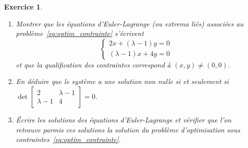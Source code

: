 \documentclass[11pt]{article}
\theoremstyle{exostyle}
\newtheorem{exercice}{Exercice}
\begin{document}
\begin{exercice}
\begin{enumerate}
  \item Montrer que les équations d’Euler-Lagrange (ou extrema liés) associées au problème~\eqref{eq:optim_contrainte} s’écrivent 
    \[
      \left\lbrace 
        \begin{aligned}
          2x + (\lambda-1) y = 0 \\
          (\lambda-1)x + 4y =0
        \end{aligned}
      \right.
    \]
    et que la qualification des contraintes correspond à $(x,y) \not= (0,0)$.

  \item En déduire que le système a une solution non nulle si et seulement si $\det \begin{bmatrix}
      2 & \lambda-1 \\
      \lambda -1 & 4
    \end{bmatrix} = 0$.

  \item Écrire les solutions des équations d’Euler-Lagrange et vérifier que l’on retrouve parmis ces solutions la solution du problème d’optimisation sous contraintes~\eqref{eq:optim_contrainte}.
  \end{enumerate}
\end{exercice}

\newpage
\end{document}
